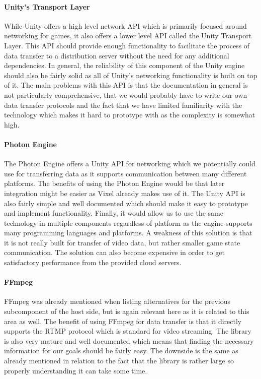 \paragraph{Unity's Transport Layer}
While Unity offers a high level network API which is primarily focused around networking for games, it also offers a lower level API called the Unity Transport Layer\cite{unity_transportLayer}. This API should provide enough functionality to facilitate the process of data transfer to a distribution server without the need for any additional dependencies. In general, the reliability of this component of the Unity engine should also be fairly solid as all of Unity's networking functionality is built on top of it. The main problems with this API is that the documentation in general is not particularly comprehensive, that we would probably have to write our own data transfer protocols and the fact that we have limited familiarity with the technology which makes it hard to prototype with as the complexity is somewhat high. 

\paragraph{Photon Engine}
The Photon Engine\cite{photon_homepage} offers a Unity API for networking which we potentially could use for transferring data as it supports communication between many different platforms. The benefits of using the Photon Engine would be that later integration might be easier as Vixel already makes use of it. The Unity API is also fairly simple and well documented which should make it easy to prototype and implement functionality. Finally, it would allow us to use the same technology in multiple components regardless of platform as the engine supports many programming languages and platforms. A weakness of this solution is that it is not really built for transfer of video data, but rather smaller game state communication. The solution can also become expensive in order to get satisfactory performance from the provided cloud servers. 

\paragraph{FFmpeg}
FFmpeg was already mentioned when listing alternatives for the previous subcomponent of the host side, but is again relevant here as it is related to this area as well. The benefit of using FFmpeg for data transfer is that it directly supports the RTMP protocol which is standard for video streaming. The library is also very mature and well documented which means that finding the necessary information for our goals should be fairly easy. The downside is the same as already mentioned in relation to the fact that the library is rather large so properly understanding it can take some time. 

